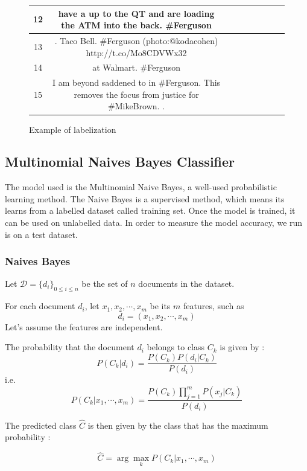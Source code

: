 \documentclass[a4paper,twoside,12pt,openright]{report}
\newcommand{\nl}{\tabularnewline\midrule}
\begin{document}
\begin{figure}[h!]
\begin{tabular}{c|Cp{3cm}}
12 &  have  a  up to the QT and are loading the ATM into the back. \#Ferguson &  \newline {} \nl
13 & . Taco Bell. \#Ferguson (photo:@kodacohen) http://t.co/Mo8CDVWx32 &  \newline {} \nl
14 &   at Walmart. \#Ferguson &  \newline {} \nl
15 & I am beyond saddened to  in \#Ferguson. This removes the focus from justice for \#MikeBrown. . &  \newline {} \nl
\end{tabular}
\caption{Example of labelization}
\label{tabtypes}
\end{figure}

\subsection{Multinomial Naives Bayes Classifier}

The model used is the Multinomial Naive Bayes, a well-used probabilistic learning method.
The Naive Bayes is a supervised method, which means its learns from a labelled dataset called training set. Once the model is trained, it can be used on unlabelled data. In order to measure the model accuracy, we run is on a test dataset.

\subsubsection{Naives Bayes}
Let $ \mathcal{D} = \{ d_i \}_{0\leq i\leq n} $ be the set of $n$ documents in the dataset.

For each document $d_i$, let $x_{1},x_{2},\cdots,x_{m}$ be its $m$ features, such as $$d_i = (x_{1},x_{2},\cdots,x_{m})$$
Let's assume the features are independent.

The probability that the document $d_i$ belongs to class $C_k$ is given by :
$$ P(C_k|d_i) = \frac{P(C_k)P(d_i|C_k)}{P(d_i)} $$
i.e. $$ P(C_k|x_{1},\cdots,x_{m}) = \frac{P(C_k)\prod_{j=1}^mP(x_{j}|C_k)}{P(d_i)} $$

The predicted class $\hat{C}$ is then given by the class that has the maximum probability :

$$ \hat{C} = \arg \max_k P(C_k|x_{1},\cdots,x_{m}) $$
\end{document}
